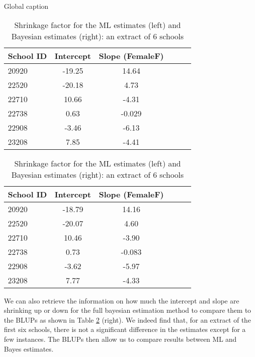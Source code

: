 \begin{table}[!htb]
	\caption{Global caption}
	
	\begin{minipage}{.5\linewidth}
		\caption{}
		\centering
		{
			\begin{tabular}{l | c c c c c}
				School ID & Intercept & Slope (FemaleF)\\
				\hline
				20920 & -19.25 & 14.64 \\
				22520 & -20.18 & 4.73 \\
				22710 & 10.66 & -4.31 \\
				22738  & 0.63 & -0.029 \\
				22908 & -3.46 & -6.13 \\
				23208 & 7.85 & -4.41
			\end{tabular}
		}
	\end{minipage}%
	\begin{minipage}{.5\linewidth}
		\centering
		\caption{}
		{
			\begin{tabular}{l | c c c c c}
				School ID & Intercept & Slope (FemaleF)\\
				\hline
				20920 & -18.79 & 14.16 \\
				22520 & -20.07 & 4.60 \\
				22710  & 10.46 & -3.90 \\
				22738  & 0.73 & -0.083  \\
				22908 & -3.62 & -5.97 \\
				23208  & 7.77 & -4.33
			\end{tabular}
		}
		
	\end{minipage}
	\caption{{\small Shrinkage factor for the ML estimates (left) and Bayesian estimates (right): an extract of 6 schools}}
	\label{tab:shrinkage}
\end{table}

We can also retrieve the information on how much the intercept and slope are shrinking up or down for the full bayesian estimation method to compare them to the BLUPs as shown in Table \ref{tab:shrinkage} (right). We indeed find that, for an extract of the first six schools, there is not a significant difference in the estimates except for a few instances. The BLUPs then allow us to compare results between ML and Bayes estimates.

